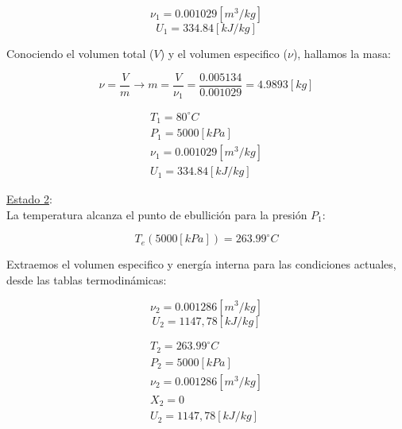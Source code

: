 \documentclass[letter,11pt]{article}
\begin{document}
\begin{enumerate}
\begin{equation*}
    \nu_1=0.001029[m^3/kg]
\end{equation*}
\begin{equation*}
    U_1=334.84[kJ/kg]
\end{equation*}

Conociendo el volumen total ($V$) y el volumen especifico ($\nu$), hallamos la
masa:

\begin{equation*}
    \nu=\frac{V}{m}\rightarrow
    m=\frac{V}{\nu_1}=\frac{0.005134}{0.001029}=4.9893[kg]
\end{equation*}

\begin{equation*}
\boxed{
    \begin{array}{l}
        T_1=80^\circ C \\
        P_1=5000[kPa] \\
        \nu_1=0.001029[m^3/kg] \\
        U_1=334.84[kJ/kg]
    \end{array}
}
\end{equation*}

\underline{Estado 2}:\\
La temperatura alcanza el punto de ebullición para la presión $P_1$:

\begin{equation*}
    T_{e}(5000[kPa])=263.99^\circ C
\end{equation*}

Extraemos el volumen especifico y energía interna para las condiciones actuales,
desde las tablas termodinámicas:

\begin{equation*}
    \nu_2=0.001286[m^3/kg]
\end{equation*}
\begin{equation*}
    U_2=1147,78[kJ/kg]
\end{equation*}

\begin{equation*}
\boxed{
    \begin{array}{l}
        T_2=263.99^\circ C \\
        P_2=5000[kPa] \\
        \nu_2=0.001286[m^3/kg] \\
        X_2=0 \\
        U_2=1147,78[kJ/kg]
    \end{array}
}
\end{equation*}


\end{enumerate}
\end{document}
